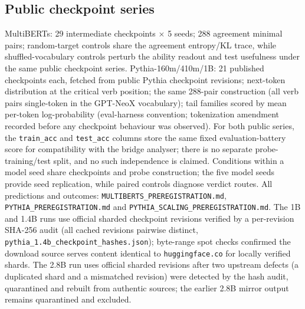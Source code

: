 \documentclass[11pt]{article}
\theoremstyle{definition}
\begin{document}
\subsection*{Public checkpoint series}
MultiBERTs: 29 intermediate checkpoints $\times$ 5 seeds; 288
agreement minimal pairs; random-target controls share the agreement
entropy/KL trace, while shuffled-vocabulary controls perturb the
ability readout and test usefulness under the same public checkpoint
series. Pythia-160m/410m/1B:
21 published checkpoints each, fetched from public Pythia checkpoint
revisions; next-token
distribution at the critical verb position; the same 288-pair
construction (all verb pairs single-token in the GPT-NeoX vocabulary);
tail families scored by mean per-token log-probability
(eval-harness convention; tokenization amendment recorded before any
checkpoint behaviour was observed). For both public series, the
\texttt{train\_acc} and \texttt{test\_acc} columns store the same fixed
evaluation-battery score for compatibility with the bridge analyser;
there is no separate probe-training/test split, and no such independence
is claimed. Conditions within a model seed share checkpoints and probe
construction; the five model seeds provide seed replication, while
paired controls diagnose verdict routes. All predictions and outcomes:
\texttt{MULTIBERTS\_PREREGISTRATION.md},
\texttt{PYTHIA\_PREREGISTRATION.md} and
\texttt{PYTHIA\_SCALING\_PREREGISTRATION.md}. The 1B and 1.4B runs use
official sharded checkpoint revisions verified by a per-revision
SHA-256 audit (all cached revisions pairwise distinct,
\texttt{pythia\_1.4b\_checkpoint\_hashes.json}); byte-range spot checks
confirmed the download source serves content identical to
\texttt{huggingface.co} for locally verified shards. The 2.8B run uses
official sharded revisions after two upstream defects (a duplicated
shard and a mismatched revision) were detected by the hash audit,
quarantined and rebuilt from authentic sources; the earlier 2.8B
mirror output remains quarantined and excluded.
\end{document}
